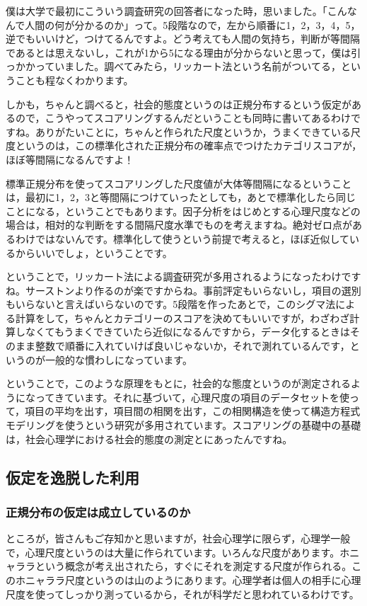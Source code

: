 \documentclass{ltjsbook}
\begin{document}
僕は大学で最初にこういう調査研究の回答者になった時，思いました。「こんなんで人間の何が分かるのか」って。5段階なので，左から順番に1，2，3，4，5，逆でもいいけど，つけてるんですよ。どう考えても人間の気持ち，判断が等間隔であるとは思えないし，これが1から5になる理由が分からないと思って，僕は引っかかっていました。調べてみたら，リッカート法という名前がついてる，ということも程なくわかります。

しかも，ちゃんと調べると，社会的態度というのは正規分布するという仮定があるので，こうやってスコアリングするんだということも同時に書いてあるわけですね。ありがたいことに，ちゃんと作られた尺度というか，うまくできている尺度というのは，この標準化された正規分布の確率点でつけたカテゴリスコアが，ほぼ等間隔になるんですよ！

標準正規分布を使ってスコアリングした尺度値が大体等間隔になるということは，最初に1，2，3と等間隔につけていったとしても，あとで標準化したら同じことになる，ということでもあります。因子分析をはじめとする心理尺度などの場合は，相対的な判断をする間隔尺度水準でものを考えますね。絶対ゼロ点があるわけではないんです。標準化して使うという前提で考えると，ほぼ近似しているからいいでしょ，ということです。

ということで，リッカート法による調査研究が多用されるようになったわけですね。サーストンより作るのが楽ですからね。事前評定もいらないし，項目の選別もいらないと言えばいらないのです。5段階を作ったあとで，このシグマ法による計算をして，ちゃんとカテゴリーのスコアを決めてもいいですが，わざわざ計算しなくてもうまくできていたら近似になるんですから，データ化するときはそのまま整数で順番に入れていけば良いじゃないか，それで測れているんです，というのが一般的な慣わしになっています。

ということで，このような原理をもとに，社会的な態度というのが測定されるようになってきています。それに基づいて，心理尺度の項目のデータセットを使って，項目の平均を出す，項目間の相関を出す，この相関構造を使って構造方程式モデリングを使うという研究が多用されています。スコアリングの基礎中の基礎は，社会心理学における社会的態度の測定とにあったんですね。

\subsection{仮定を逸脱した利用}

\subsubsection{正規分布の仮定は成立しているのか}
ところが，皆さんもご存知かと思いますが，社会心理学に限らず，心理学一般で，心理尺度というのは大量に作られています。いろんな尺度があります。ホニャララという概念が考え出されたら，すぐにそれを測定する尺度が作られる。このホニャララ尺度というのは山のようにあります。心理学者は個人の相手に心理尺度を使ってしっかり測っているから，それが科学だと思われているわけです。
\end{document}
